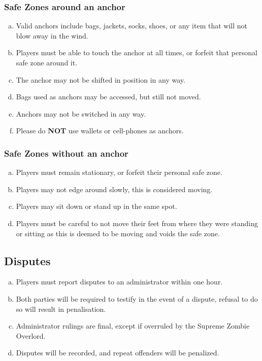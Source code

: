 \documentclass[a4paper,12pt]{article}
\begin{document}
\subsubsection{Safe Zones around an anchor}

\begin{enumerate}[(a)]
    \item Valid anchors include bags, jackets, socks, shoes, or any item that will not blow away in the wind.
    \item Players must be able to touch the anchor at all times, or forfeit that personal safe zone around it.
    \item The anchor may not be shifted in position in any way.
    \item Bags used as anchors may be accessed, but still not moved.
    \item Anchors may not be switched in any way.
    \item Please do {\bf NOT} use wallets or cell-phones as anchors.
\end{enumerate}

\subsubsection{Safe Zones without an anchor}
\begin{enumerate}[(a)]
    \item Players must remain stationary, or forfeit their personal safe zone.
    \item Players may not edge around slowly, this is considered moving.
    \item Players may sit down or stand up in the same spot. 
    \item Players must be careful to not move their feet from where they were standing or sitting as this is deemed to be moving and voids the safe zone.
\end{enumerate}

\subsection{Disputes}
\begin{enumerate}[(a)]
    \item Players must report disputes to an administrator within one hour.
    \item Both parties will be required to testify in the event of a dispute, refusal to do so will result in penalisation.
    \item Administrator rulings are final, except if overruled by the Supreme Zombie Overlord.
    \item Disputes will be recorded, and repeat offenders will be penalized. 
\end{enumerate}
\end{document}
